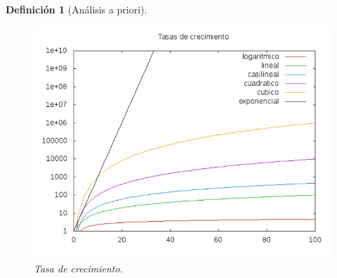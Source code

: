 \documentclass[12pt,twoside]{article}
\newtheorem{defi}{Definición}
\begin{document}
\begin{defi}[Análisis a priori]
\begin{figure}[h!]
\centering
\includegraphics[scale=0.35]{orden de complejidad.jpg}
\caption{Tasa de crecimiento.}
\label{fig:tasa}
\end{figure}

\end{defi}
\clearpage
\\
\end{document}

